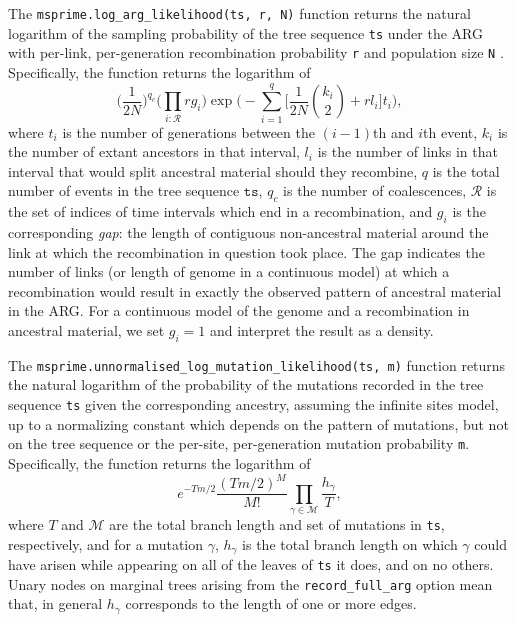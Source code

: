 \documentclass[9pt,twocolumn,twoside,lineno]{gsajnl}
\begin{document}
The \texttt{msprime.log\_arg\_likelihood(ts, r, N)} function
returns the natural logarithm of
the sampling probability of the tree sequence \texttt{ts} under the ARG with per-link,
per-generation recombination probability \texttt{r} and population size \texttt{N} \citep[e.g.][equation (1)]{kuhner2000maximum}.
Specifically, the function returns the logarithm of
\begin{equation*}
\Bigg( \frac{ 1 }{ 2 N } \Bigg)^{ q_c } \Bigg( \prod_{ i : \mathcal{R} } r g_i \Bigg)
	\exp\Bigg( -\sum_{ i = 1 }^q \Big[\frac{ 1 }{ 2 N } \binom{ k_i }{ 2 }
		+ r l_i \Big] t_i  \Bigg),
\end{equation*}
where $t_i$ is the number of generations between the $(i - 1)$th and $i$th event,
$k_i$ is the number of extant ancestors in that interval, $l_i$ is the number of links
in that interval that would split ancestral material should they recombine,
$q$ is the total number of events in the tree sequence $\texttt{ts}$,
$q_c$ is the number of coalescences, $\mathcal{R}$ is the set of indices
of time intervals which end in a recombination, and $g_i$ is the corresponding \emph{gap}:
the length of contiguous non-ancestral material around the link at which
the recombination in question took place. The gap indicates the number of links
(or length of genome in a continuous model) at which a recombination would result
in exactly the observed pattern of ancestral material in the ARG.
For a continuous model of the genome and a recombination in ancestral material,
we set $g_i = 1$ and interpret the result as a density.

The \texttt{msprime.unnormalised\_log\_mutation\_likelihood(ts, m)} function returns the
natural logarithm of the probability of the mutations recorded in the tree sequence
\texttt{ts} given the corresponding ancestry, assuming the infinite sites model, up to
a normalizing constant which depends on the pattern of mutations,
but not on the tree sequence or the per-site, per-generation mutation
probability \texttt{m}.
Specifically, the function returns the logarithm of
\begin{equation*}
e^{ - T m / 2 } \frac{ ( T m / 2 )^M }{ M ! }
\prod_{ \gamma \in \mathcal{ M } } \frac{ h_{ \gamma } }{ T },
\end{equation*}
where $T$ and $\mathcal{M}$ are the total branch length and set of mutations
in \texttt{ts}, respectively, and for a mutation $\gamma$, $h_{ \gamma }$ is the
total branch length on which $\gamma$ could have arisen while appearing on all
of the leaves of \texttt{ts} it does, and on no others.
Unary nodes on marginal trees arising from the \texttt{record\_full\_arg} option
mean that, in general $h_{ \gamma }$ corresponds to the length of one or more
edges.
\end{document}
